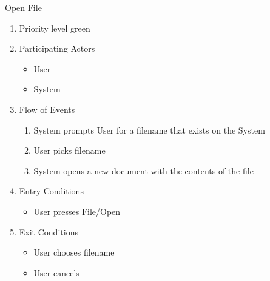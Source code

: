 \documentclass[a4paper, 12pt]{article}
\begin{document}
\item{Open File}
  \begin{enumerate}
  \item{Priority} level green
  \item{Participating Actors}
    \begin {itemize}
    \item User
    \item System
    \end{itemize}
  \item{Flow of Events}
    \begin{enumerate}
    \item {System prompts User for a filename that exists on the System}
    \item {User picks filename}
    \item {System opens a new document with the contents of the file}
    \end{enumerate}
  \item {Entry Conditions}
    \begin{itemize}
    \item User presses File/Open
    \end{itemize}
  \item Exit Conditions
    \begin{itemize}
    \item User chooses filename
    \item User cancels
    \end{itemize}
  \end {enumerate}
\end{document}
